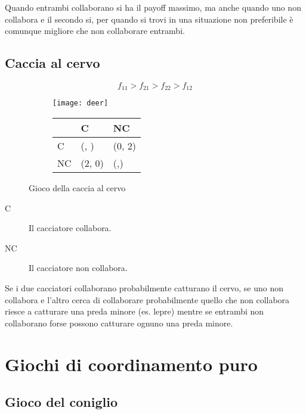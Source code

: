 \documentclass[\main/main.tex]{subfiles}
\begin{document}
Quando entrambi collaborano si ha il payoff massimo, ma anche quando uno non collabora e il secondo si, per quando si trovi in una situazione non preferibile è comunque migliore che non collaborare entrambi.

\subsection{Caccia al cervo}
\[
  f_{11} > f_{21} > f_{22} > f_{12}
\]

\begin{figure}
  \begin{subfigure}{0.49\textwidth}
    \texttt{[image: deer]}
  \end{subfigure}
  \begin{subfigure}{0.49\textwidth}
    \begin{table}
      \begin{tabular}{|L|L|L|}
        \hline
           & C                      & NC                    \\
        \hline
        C  & (, ) & (0, 2)                \\
        \hline
        NC & (2, 0)                 & (,) \\
        \hline
      \end{tabular}
    \end{table}
  \end{subfigure}
  \caption{Gioco della caccia al cervo}
\end{figure}

\begin{description}
  \item[C] Il cacciatore collabora.
  \item[NC] Il cacciatore non collabora.
\end{description}

Se i due cacciatori collaborano probabilmente catturano il cervo, se uno non collabora e l'altro cerca di collaborare probabilmente quello che non collabora riesce a catturare una preda minore (es. lepre) mentre se entrambi non collaborano forse possono catturare ognuno una preda minore.

\section{Giochi di coordinamento puro}
\subsection{Gioco del coniglio}
\end{document}
